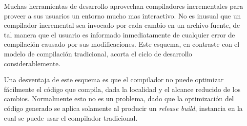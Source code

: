\documentclass[12pt, a4paper]{report}
\begin{document}
    Muchas herramientas de desarrollo aprovechan compiladores incrementales para proveer a sus usuarios un entorno mucho mas interactivo.
    No es inusual que un compilador incremental sea invocado por cada cambio en un archivo fuente, de tal manera que el usuario es informado inmediatamente de cualquier error de compilación causado por sus modificaciones.
    Este esquema, en contraste con el modelo de compilación tradicional, acorta el ciclo de desarrollo considerablemente.
    \cite{wiki_incremental_compiler}

    Una desventaja de este esquema es que el compilador no puede optimizar fácilmente el código que compila, dada la localidad y el alcance reducido de los cambios.
    Normalmente esto no es un problema, dado que la optimización del código generado se aplica solamente al producir un \textit{release build}, instancia en la cual se puede usar el compilador tradicional.
    \cite{wiki_incremental_compiler}
\end{document}
